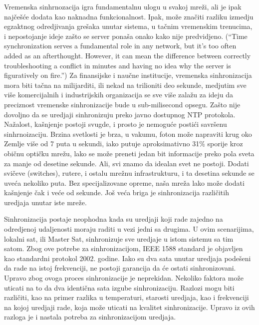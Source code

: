 \documentclass[a4paper,12pt, master]{etf}
\begin{document}
	Vremenska sinhrnozacija igra fundamentalnu ulogu u svakoj mre\v{z}i, ali je 
	ipak naj\v{c}e\v{s}\'{c}e dodata kao naknadna funkcionalnost. Ipak, 
	mo\v{z}e zna\v{c}iti razliku izmedju egzaktnog odredjivanja gre\v{s}aka 
	unutar sistema, u ta\v{c}nim vremenskim trenucima, i nepostojanje ideje
	za\v{s}to se server pona\v{s}a onako kako nije predvidjeno. (``Time 
	synchronization	serves a fundamental role in any network, but it's too 
	often added as an afterthought.	However, it can mean the difference between 
	correctly troubleshooting a conflict in	minutes and having no idea why the 
	server is figuratively on fire.'') Za finansijske i nau\v{c}ne institucije, 
	vremenska sinhronizacija mora biti ta\v{c}na na milijarditi, ili nekad na
	trilioniti deo sekunde, medjutim sve vi\v{s}e komercijalnih i industrijskih 
	organizacija se sve vi\v{s}e zala\v{z}u za ideju da preciznost vremenske 
	sinhronizacije bude u sub-milisecond opsegu. Za\v{s}to nije dovoljno da se 
	uredjaji sinhronizuju preko javno dostupnog NTP protokola. Na\v{z}alost, 
	ka\v{s}njenje postoji svugde, i prosto je nemogu\'{c}e posti\'{c}i 
	savr\v{s}enu sinhrnoizaciju. Brzina svetlosti je brza, u vakumu, foton 
	mo\v{z}e napraviti krug oko Zemlje vi\v{s}e od 7 puta u sekundi, iako 
	putuje aproksimativno 31\% sporije kroz obi\v{c}nu opti\v{c}ku mre\v{z}u, 
	lako se mo\v{z}e preneti jedan bit informacije preko pola sveta za manje od 
	desetine sekunde. Ali, svi znamo da idealan svet ne postoji. Dodati 
	svi\v{c}eve (switches),	rutere, i ostalu mre\v{z}nu infrastrukturu, i ta 
	desetina sekunde se uve\'{c}a nekoliko puta. Bez specijalizovane opreme, 
	na\v{s}a mre\v{z}a lako mo\v{z}e dodati ka\v{s}njenje \v{c}ak i ve\'{c}e od
	sekunde. Jo\v{s} ve\'{c}a briga je sinhronizacija razli\v{c}itih uredjaja 
	unutar iste mre\v{z}e.

	Sinhronizacija postaje neophodna kada su uredjaji koji rade zajedno na 
	odredjenoj udaljenosti moraju raditi u vezi jedni sa drugima. U ovim 
	scenarijima, lokalni sat, ili Master Sat, sinhronizuje sve uredjaje u istom 
	sistemu sa tim satom. Zbog ove potrebe za sinhronizacijom, IEEE 1588 
	standard je objavljen kao standardni protokol 2002. godine. Iako su dva 
	sata unutar uredjaja pode\v{s}eni da rade na istoj frekvenciji, ne postoji 
	garancija da \'{c}e ostati sinhronizovani. Upravo zbog ovoga proces 
	sinhronizacije je neprekidan. Nekoliko faktora mo\v{z}e uticati na to da 
	dva identi\v{c}na sata izgube sinhronizaciju. Razlozi mogu biti	
	razli\v{c}iti, kao na primer razlika u temperaturi, starosti uredjaja, kao 
	i frekvenciji na kojoj uredjaji rade, koja mo\v{z}e uticati na kvalitet 
	sinhronizacije. Upravo iz ovih razloga je i	nastala potreba za 
	sinhronizacijom uredjaja.
\end{document}
